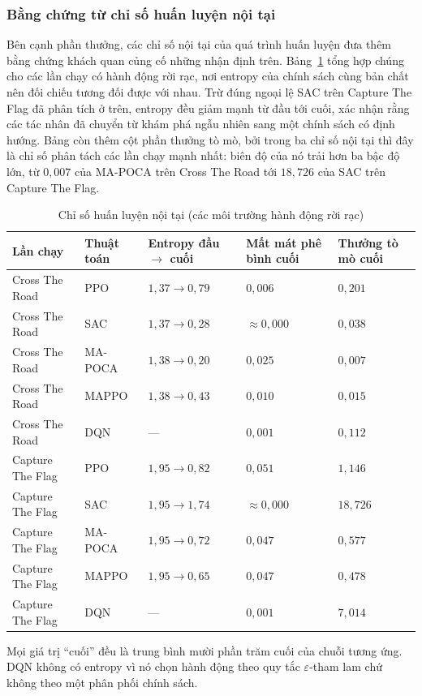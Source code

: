 \subsubsection{Bằng chứng từ chỉ số huấn luyện nội tại}
\indent Bên cạnh phần thưởng, các chỉ số nội tại của quá trình huấn luyện đưa thêm bằng
chứng khách quan củng cố những nhận định trên. Bảng~\ref{tab:diagnostics} tổng hợp chúng
cho các lần chạy có hành động rời rạc, nơi entropy của chính sách cùng bản chất nên đối
chiếu tương đối được với nhau. Trừ đúng ngoại lệ SAC trên Capture The Flag đã phân tích ở
trên, entropy đều giảm mạnh từ đầu tới cuối, xác nhận rằng các tác nhân đã chuyển từ khám
phá ngẫu nhiên sang một chính sách có định hướng. Bảng còn thêm cột phần thưởng tò mò, bởi
trong ba chỉ số nội tại thì đây là chỉ số phân tách các lần chạy mạnh nhất: biên độ của nó
trải hơn ba bậc độ lớn, từ $0{,}007$ của MA-POCA trên Cross The Road tới $18{,}726$ của
SAC trên Capture The Flag.

\begin{table}[H]
\centering
\caption{Chỉ số huấn luyện nội tại (các môi trường hành động rời rạc)}
\label{tab:diagnostics}
\renewcommand{\arraystretch}{1.35}
\tablefont
\setlength{\tabcolsep}{4pt}
\begin{tabular}{|p{3.1cm}|>{\centering\arraybackslash}p{2.1cm}
                |>{\centering\arraybackslash}p{2.6cm}
                |>{\centering\arraybackslash}p{2.6cm}
                |>{\centering\arraybackslash}p{2.6cm}|}
\hline
\textbf{Lần chạy} & \textbf{Thuật toán} & \textbf{Entropy đầu $\to$ cuối} & \textbf{Mất mát phê bình cuối} & \textbf{Thưởng tò mò cuối} \\
\hline
Cross The Road & PPO & $1{,}37 \to 0{,}79$ & $0{,}006$ & $0{,}201$ \\
\hline
Cross The Road & SAC & $1{,}37 \to 0{,}28$ & $\approx 0{,}000$ & $0{,}038$ \\
\hline
Cross The Road & MA-POCA & $1{,}38 \to 0{,}20$ & $0{,}025$ & $0{,}007$ \\
\hline
Cross The Road & MAPPO & $1{,}38 \to 0{,}43$ & $0{,}010$ & $0{,}015$ \\
\hline
Cross The Road & DQN & --- & $0{,}001$ & $0{,}112$ \\
\hline
Capture The Flag & PPO & $1{,}95 \to 0{,}82$ & $0{,}051$ & $1{,}146$ \\
\hline
Capture The Flag & SAC & $1{,}95 \to 1{,}74$ & $\approx 0{,}000$ & $18{,}726$ \\
\hline
Capture The Flag & MA-POCA & $1{,}95 \to 0{,}72$ & $0{,}047$ & $0{,}577$ \\
\hline
Capture The Flag & MAPPO & $1{,}95 \to 0{,}65$ & $0{,}047$ & $0{,}478$ \\
\hline
Capture The Flag & DQN & --- & $0{,}001$ & $7{,}014$ \\
\hline
\end{tabular}

\vspace{0.15cm}
{\footnotesize Mọi giá trị ``cuối'' đều là trung bình mười phần trăm cuối của chuỗi
tương ứng. DQN không có entropy vì nó chọn hành động theo quy tắc $\varepsilon$-tham lam
chứ không theo một phân phối chính sách.}
\end{table}

